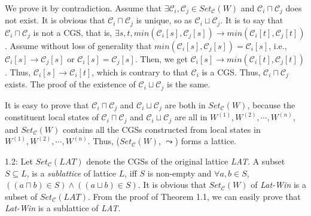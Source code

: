 \documentclass[12pt,journal,letterpaper,compsoc]{IEEEtran}
\begin{document}
We prove it by contradiction. Assume that $\exists \mathcal{C}_i, \mathcal{C}_j\in Set_{\mathcal{C}}(W)$ and $\mathcal{C}_i \sqcap \mathcal{C}_j$ does not exist. It is obvious that $\mathcal{C}_i \sqcap \mathcal{C}_j$ is unique, so as $\mathcal{C}_i \sqcup \mathcal{C}_j$. It is to say that $\mathcal{C}_i \sqcap \mathcal{C}_j$ is not a CGS, that is, $\exists s,t, min(\mathcal{C}_i[s], \mathcal{C}_j[s]) \rightarrow min(\mathcal{C}_i[t], \mathcal{C}_j[t])$. Assume without loss of generality that $min(\mathcal{C}_i[s], \mathcal{C}_j[s]) = \mathcal{C}_i[s]$, i.e., $\mathcal{C}_i[s] \rightarrow \mathcal{C}_j[s]$ or $\mathcal{C}_i[s] = \mathcal{C}_j[s]$. Then, we get $\mathcal{C}_i[s] \rightarrow min(\mathcal{C}_i[t], \mathcal{C}_j[t])$. Thus, $\mathcal{C}_i[s] \rightarrow \mathcal{C}_i[t]$, which is contrary to that $\mathcal{C}_i$ is a CGS. Thus, $\mathcal{C}_i \sqcap \mathcal{C}_j$ exists. The proof of the existence of $\mathcal{C}_i \sqcup \mathcal{C}_j$ is the same.

\iffalse
If $\mathcal{C}_i[t]$ $\rightarrow$ $\mathcal{C}_j[t]$ or $\mathcal{C}_i[t]$ = $\mathcal{C}_j[t]$, then $\mathcal{C}_i[s]$ $\rightarrow$ $\mathcal{C}_i[t]$, which is contrary to that $\mathcal{C}_i$ is a CGS; If $\mathcal{C}_j[t]$ $\rightarrow$ $\mathcal{C}_i[t]$, then $\mathcal{C}_i[s] \rightarrow \mathcal{C}_j[t] \rightarrow \mathcal{C}_i[t]$, which is also contrary to that $\mathcal{C}_i$ is a CGS. Thus, $\mathcal{C}_i \sqcap \mathcal{C}_j$ exists. The proof of the existence of $\mathcal{C}_i \sqcup \mathcal{C}_j$ is the same.
\fi

It is easy to prove that $\mathcal{C}_i \sqcap \mathcal{C}_j$ and $\mathcal{C}_i \sqcup \mathcal{C}_j$ are both in $Set_{\mathcal{C}}(W)$, because the constituent local states of $\mathcal{C}_i \sqcap \mathcal{C}_j$ and $\mathcal{C}_i \sqcup \mathcal{C}_j$ are all in $W^{(1)}, W^{(2)}, \cdots, W^{(n)}$, and $Set_{\mathcal{C}}(W)$ contains all the CGSs constructed from local states in $W^{(1)}, W^{(2)}, \cdots, W^{(n)}$. Thus, ($Set_{\mathcal{C}}(W)$, $\leadsto$) forms a lattice.

1.2: Let $Set_{\mathcal{C}}(LAT)$ denote the CGSs of the original lattice {\it LAT}. A subset $S\subseteq L$, is a {\it sublattice} of lattice $L$, iff $S$ is non-empty and $\forall a,b\in S$, $((a\sqcap b)\in S) \wedge ((a \sqcup b)\in S)$. It is obvious that $Set_{\mathcal{C}}(W)$ of {\it Lat-Win} is a subset of $Set_{\mathcal{C}}(LAT)$. From the proof of Theorem 1.1, we can easily prove that {\it Lat-Win} is a sublattice of {\it LAT}.
\end{document}
